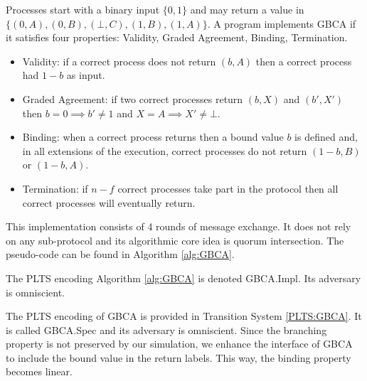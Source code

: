 Processes start with a binary input $\{0,1\}$ and may return a value in
$\{(0,A), (0,B), (\bot,C), (1,B), (1,A)\}$.
A program implements \textsf{GBCA} if it satisfies four properties: Validity, Graded Agreement,
Binding, Termination.
\begin{itemize}
    \item Validity: if a correct process does not return $(b,A)$ then a correct process had $1-b$
    as input.
    \item Graded Agreement: if two correct processes return $(b,X)$ and $(b',X')$ then
    $b = 0 \implies b' \ne 1$ and $X = A \implies X' \ne \bot$.
    \item Binding: when a correct process returns then a bound value $b$ is defined and, in all
    extensions of the execution, correct processes do not return $(1-b,B)$ or $(1-b,A)$.
    \item Termination: if $n-f$ correct processes take part in the protocol then all correct
    processes will eventually return.
\end{itemize}

\begin{implementation}
    \label{impl:GBCA}

    This implementation consists of 4 rounds of message exchange.
    It does not rely on any sub-protocol and its algorithmic core
    idea is quorum intersection. The pseudo-code can be found in
    Algorithm \ref{alg:GBCA}.
\end{implementation}

\begin{definition}
    \label{GBCA:Impl}

    The PLTS encoding Algorithm \ref{alg:GBCA} is denoted \textsf{GBCA.Impl}.
    Its adversary is omniscient.
\end{definition}

\begin{specification}
    \label{GBCA:Spec}

    The PLTS encoding of \textsf{GBCA} is provided in Transition System \ref{PLTS:GBCA}.
    It is called \textsf{GBCA.Spec} and its adversary is omniscient.
    Since the branching property is not preserved by our simulation,
    we enhance the interface of \textsf{GBCA} to include the bound value in the return
    labels. This way, the binding property becomes linear.
\end{specification}

